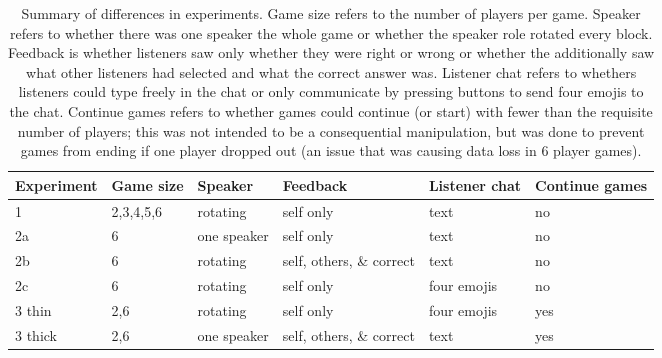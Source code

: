 \documentclass[
  english,
  a4paper,
]{article}
\begin{document}
\begin{table}

\caption{\label{tab:overview}Summary of differences in experiments. Game size refers to the number of players per game. Speaker refers to whether there was one speaker the whole game or whether the speaker role rotated every block. Feedback is whether listeners saw only whether they were right or wrong or whether the additionally saw what other listeners had selected and what the correct answer was. Listener chat refers to whethers listeners could type freely in the chat or only communicate by pressing buttons to send four emojis to the chat. Continue games refers to whether games could continue (or start) with fewer than the requisite number of players; this was not intended to be a consequential manipulation, but was done to prevent games from ending if one player dropped out (an issue that was causing data loss in 6 player games). }
\centering
\begin{tabular}[t]{l|l|l|l|l|l}
\hline
Experiment & Game size & Speaker & Feedback & Listener chat & Continue games\\
\hline
1 & 2,3,4,5,6 & rotating & self only & text & no\\
\hline
2a & 6 & one speaker & self only & text & no\\
\hline
2b & 6 & rotating & self, others, \& correct & text & no\\
\hline
2c & 6 & rotating & self only & four emojis & no\\
\hline
3 thin & 2,6 & rotating & self only & four emojis & yes\\
\hline
3 thick & 2,6 & one speaker & self, others, \& correct & text & yes\\
\hline
\end{tabular}
\end{table}
\end{document}
